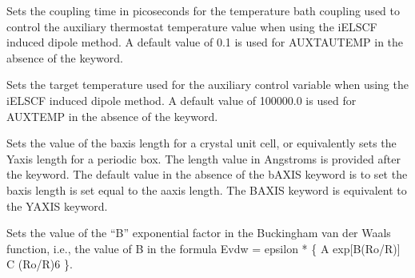 \documentclass[letterpaper,11pt,english]{sphinxmanual}
\begin{document}
\ignorespaces {}\label{\detokenize{text/keywords:key-aux-tautemp}}\begin{description}
\sphinxAtStartPar
Sets the coupling time in picoseconds for the temperature bath coupling used to control the auxiliary thermostat temperature value when using the iELSCF induced dipole method. A default value of 0.1 is used for AUX\sphinxhyphen{}TAUTEMP in the absence of the keyword.

\end{description}

\ignorespaces {}\label{\detokenize{text/keywords:key-aux-temp}}\begin{description}
\sphinxAtStartPar
Sets the target temperature used for the auxiliary control variable when using the iELSCF induced dipole method. A default value of 100000.0 is used for AUX\sphinxhyphen{}TEMP in the absence of the keyword.

\end{description}

\ignorespaces {}\label{\detokenize{text/keywords:key-b-axis}}\begin{description}
\sphinxAtStartPar
Sets the value of the b\sphinxhyphen{}axis length for a crystal unit cell, or equivalently sets the Y\sphinxhyphen{}axis length for a periodic box. The length value in Angstroms is provided after the keyword. The default value in the absence of the b\sphinxhyphen{}AXIS keyword is to set the b\sphinxhyphen{}axis length is set equal to the a\sphinxhyphen{}axis length. The B\sphinxhyphen{}AXIS keyword is equivalent to the Y\sphinxhyphen{}AXIS keyword.

\end{description}

\ignorespaces {}\label{\detokenize{text/keywords:key-b-expterm}}\begin{description}
\sphinxAtStartPar
Sets the value of the “B” exponential factor in the Buckingham van der Waals function, i.e., the value of B in the formula Evdw = epsilon * \{ A exp{[}\sphinxhyphen{}B(Ro/R){]} \sphinxhyphen{} C (Ro/R)6 \}.

\end{description}
\end{document}
